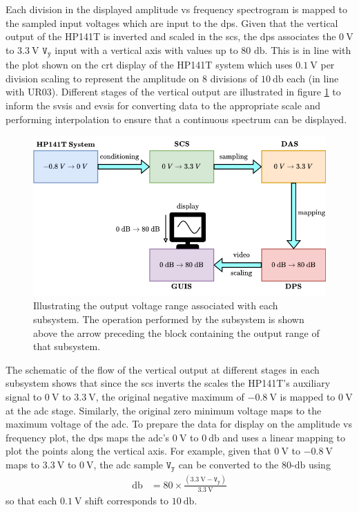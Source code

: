 \documentclass[class=report,11pt,crop=false]{standalone}
\begin{document}
	Each division in the displayed amplitude vs frequency spectrogram is mapped to the sampled input voltages which are input to the \acrshort{dps}. Given that the vertical output of the HP141T is inverted and scaled in the \acrshort{scs}, the \acrshort{dps} associates the $\SI{0}{\volt}$ to $\SI{3.3}{\volt}$ $\texttt{V}_\texttt{y}$ input with a vertical axis with values up to 80 $\si{\decibel}$. This is in line with the plot shown on the \acrshort{crt} display of the HP141T system which uses $\SI{0.1}{\volt}$ per division scaling to represent the amplitude on 8 divisions of $\SI{10}{\decibel}$ each (in line with UR03). Different stages of the vertical output are illustrated in figure \ref{fig:dps-vertical-scaling} to inform the \acrshort{svsis} and \acrshort{evsis} for converting data to the appropriate scale and performing interpolation to ensure that a continuous spectrum can be displayed. 
	\begin{figure}[ht!]
		\centering
		\includegraphics[width=0.58\linewidth]{Figures/Methodology/dps-vertical-scaling}
		\caption{Illustrating the output voltage range associated with each subsystem. The operation performed by the subsystem is shown above the arrow preceding the block containing the output range of that subsystem.}
		\label{fig:dps-vertical-scaling}
	\end{figure} 
	The schematic of the flow of the vertical output at different stages in each subsystem shows that since the \acrshort{scs} inverts the scales the HP141T's auxiliary signal to $\SI{0}{\volt}$ to $\SI{3.3}{\volt}$, the original negative maximum of $-\SI{0.8}{\volt}$ is mapped to $\SI{0}{\volt}$ at the \acrshort{adc} stage. Similarly, the original zero minimum voltage maps to the maximum voltage of the \acrshort{adc}. To prepare the data for display on the amplitude vs frequency plot, the \acrshort{dps} maps the \acrshort{adc}'s $\SI{0}{\volt}$ to $\SI{0}{\decibel}$ and uses a linear mapping to plot the points along the vertical axis. For example, given that $\SI{0}{\volt}$ to $-\SI{0.8}{\volt}$ maps to $\SI{3.3}{\volt}$ to $\SI{0}{\volt}$, the \acrshort{adc} sample $\texttt{V}_\texttt{y}$ can be converted to the 80-$\si{\decibel}$ using
	\begin{align}
		\si{\decibel}	& = 80\times \frac{(\SI{3.3}{\volt} - \texttt{V}_\texttt{y})}{\SI{3.3}{\volt}}
	\end{align} 
	so that each $\SI{0.1}{\volt}$ shift corresponds to $\SI{10}{\decibel}$. 
	
\end{document}
